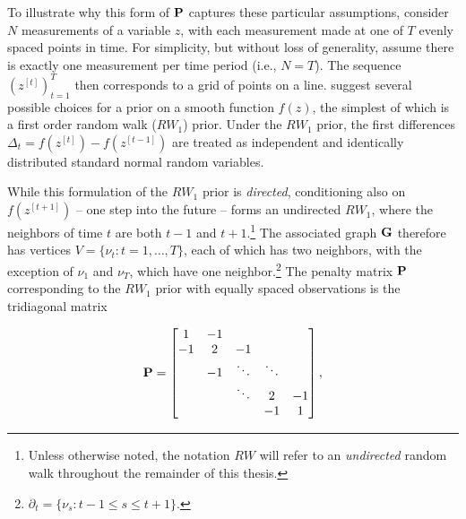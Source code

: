 To illustrate why this form of $\mathbf{P}$ captures these particular assumptions, 
consider $N$ measurements of a variable $z$, with each measurement made at 
one of $T$ evenly spaced points in time. For simplicity, but without loss of generality,  
assume there is exactly one measurement per time period (i.e., $N = T$).  
The sequence $(z^{[t]})_{t=1}^T$ then corresponds to a grid of points on a line. 
 suggest several possible choices for a prior on a smooth
function $f(z)$, the simplest of which is a first order random walk ($RW_1$) prior.  Under 
the $RW_1$ prior, the first differences $\Delta_t = f(z^{[t]}) - f(z^{[t-1]})$ are treated as 
independent and identically distributed standard normal random variables. 

While this formulation of the $RW_1$ prior is {\it directed}, conditioning also on 
$f(z^{[t+1]})$ -- one step into the future -- forms an undirected $RW_1$, where 
the neighbors of time $t$ are both $t-1$ and $t+1$.\footnote{Unless otherwise 
noted, the notation $RW$ will refer to an {\it undirected} random walk throughout 
the remainder of this thesis.} The associated graph $\mathbf{G}$ therefore has vertices 
$V=\{\nu_t : t=1,\dots,T\}$, each of which has two neighbors, with the exception of 
$\nu_1$ and $\nu_T$, which have one neighbor.\footnote{$\partial_t = \{\nu_{s} : 
t - 1 \leq s \leq t + 1\}.$}  The penalty matrix $\mathbf{P}$ corresponding to the $RW_1$ 
prior with equally spaced observations is the tridiagonal matrix

\begin{equation*}
\mathbf{P} = 
\begin{bmatrix}
1  	& -1 	& 		& 	& \\
-1  	& 2 	& -1 		& 	& \\
  	& -1 & \ddots 	& \ddots	& \\
  	&  	& \ddots 	& 2 	& -1\\
  	&  	& 		& -1 	& 1\\
\end{bmatrix},
\end{equation*}

